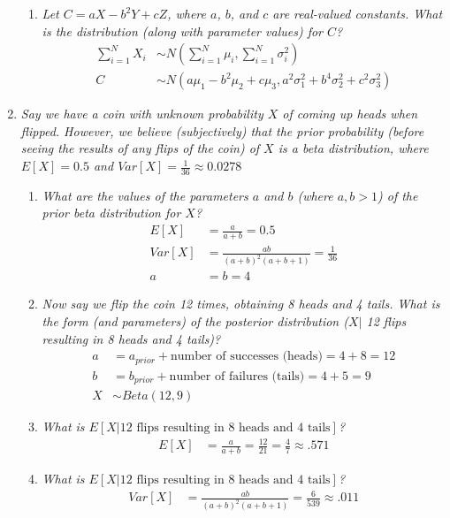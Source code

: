 \documentclass{article} %
\begin{document}
\begin{enumerate}
\begin{enumerate}
		\item \textit{Let $C = aX - b^2Y + cZ$, where $a$, $b$, and $c$ are real-valued constants. What is the distribution (along with parameter values) for $C$?}
		\begin{align*}
		\sum_{i=1}^{N} X_i &\sim N(\sum_{i=1}^{N} \mu_i, \sum_{i=1}^{N} \sigma_{i}^{2})\\
		C &\sim N(a\mu_1 - b^2\mu_2 + c\mu_3, a^2\sigma_1^2 + b^4\sigma_2^2 + c^2\sigma_3^2)
		\end{align*}
		
	\end{enumerate}
	
	\item \textit{Say we have a coin with unknown probability $X$ of coming up heads when flipped. However, we believe (subjectively) that the prior probability (before seeing the results of any flips of the coin) of $X$ is a beta distribution, where $E[X] = 0.5$ and $Var[X] = \frac{1}{36} \approx 0.0278$}
	\begin{enumerate}
		\item \textit{What are the values of the parameters $a$ and $b$ (where $a,b > 1$) of the prior beta distribution for $X$?}
		\begin{align*}
		E[X] &= \frac{a}{a + b} = 0.5\\
		Var[X] &= \frac{ab}{(a + b)^2(a + b + 1)} = \frac{1}{36}\\
		a &= b = 4
		\end{align*}
		
		\item \textit{Now say we flip the coin 12 times, obtaining 8 heads and 4 tails. What is the form (and parameters) of the posterior distribution ($X |$ 12 flips resulting in 8 heads and 4 tails)?}
		\begin{align*}
		a &= a_{prior} + \text{number of successes (heads)} = 4 + 8 = 12\\
		b &= b_{prior} + \text{number of failures (tails)} = 4 + 5 = 9\\
		X &\sim Beta(12, 9)
		\end{align*}
		
		\item \textit{What is $E[X | \text{12 flips resulting in 8 heads and 4 tails}]$?}
		\begin{align*}
		E[X] &= \frac{a}{a + b} = \frac{12}{21} = \frac{4}{7} \approx .571
		\end{align*}
		
		\item \textit{What is $E[X | \text{12 flips resulting in 8 heads and 4 tails}]$?}
		\begin{align*}
		Var[X] &= \frac{ab}{(a + b)^2(a + b + 1)} = \frac{6}{539} \approx .011
		\end{align*}
		

\end{enumerate}
\end{enumerate}
\end{document}
